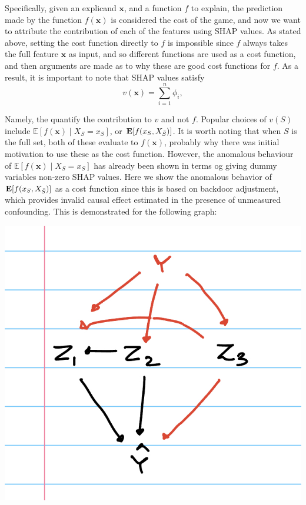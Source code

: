 \documentclass{article}
\begin{document}
Specifically, given an explicand $\mathbf{x}$, and a function $f$ to explain, the prediction made by the function $f(\mathbf{x})$ is considered the cost of the game, and now we want to attribute the contribution of each of the features using SHAP values. As stated above, setting the cost function directly to $f$ is impossible since $f$ always takes the full feature $\mathbf{x}$ as input, and so different functions are used as a cost function, and then arguments are made as to why these are good cost functions for $f$. As a result, it is important to note that SHAP values satisfy 
\[
v(\mathbf{x}) = \sum_{i = 1}^n \phi_i,
\]

Namely, the quantify the contribution to $v$ and not $f$. Popular choices of $v(S)$ include $\mathbb{E}[f(\mathbf{x}) \mid X_S = x_S ]$, or $\mathbf{E}[f(x_S, X_{\Bar{S}})]$. It is worth noting that when $S$ is the full set, both of these evaluate to $f(\mathbf{x})$, probably why there was initial motivation to use these as the cost function. However, the anomalous behaviour of  $\mathbb{E}[f(\mathbf{x}) \mid X_S = x_S ]$ has already been shown in terms og giving dummy variables non-zero SHAP values. Here we show the anomalous behavior of $\mathbf{E}[f(x_S, X_{\Bar{S}})]$ as a cost function since this is based on backdoor adjustment, which provides invalid causal effect estimated in the presence of unmeasured confounding. This is demonstrated for the following graph:


\begin{center}
\includegraphics[scale = 0.2]{Do-SHAP_Counterexample.jpeg}
\end{center}
\end{document}
